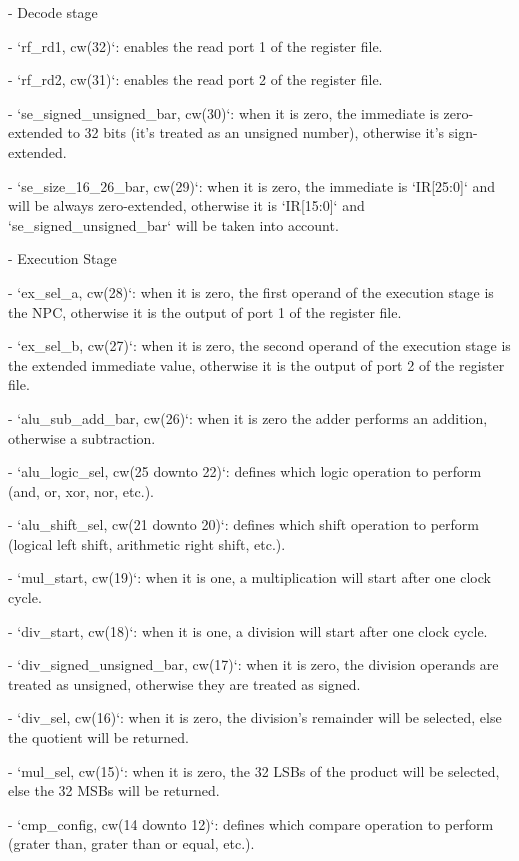 \begin{markdown}
- Decode stage

    - `rf_rd1, cw(32)`: enables the read port 1 of the register file.

    - `rf_rd2, cw(31)`: enables the read port 2 of the register file.

    - `se_signed_unsigned_bar, cw(30)`: when it is zero, the immediate is zero-extended to 32 bits (it's treated as an unsigned number), otherwise it's sign-extended.  

    - `se_size_16_26_bar, cw(29)`: when it is zero, the immediate is `IR[25:0]` and will be always zero-extended, otherwise it is `IR[15:0]` and `se_signed_unsigned_bar` will be taken into account.

- Execution Stage

    - `ex_sel_a, cw(28)`: when it is zero, the first operand of the execution stage is the NPC, otherwise it is the output of port 1 of the register file.

    - `ex_sel_b, cw(27)`: when it is zero, the second operand of the execution stage is the extended immediate value, otherwise it is the output of port 2 of the register file.

    - `alu_sub_add_bar, cw(26)`: when it is zero the adder performs an addition, otherwise a subtraction.

    - `alu_logic_sel, cw(25 downto 22)`: defines which logic operation to perform (and, or, xor, nor, etc.).

    - `alu_shift_sel, cw(21 downto 20)`: defines which shift operation to perform (logical left shift, arithmetic right shift, etc.).

    - `mul_start, cw(19)`: when it is one, a multiplication will start after one clock cycle.

    - `div_start, cw(18)`: when it is one, a division will start after one clock cycle.

    - `div_signed_unsigned_bar, cw(17)`: when it is zero, the division operands are treated as unsigned, otherwise they are treated as signed.

    - `div_sel, cw(16)`: when it is zero, the division's remainder will be selected, else the quotient will be returned.

    - `mul_sel, cw(15)`: when it is zero, the 32 LSBs of the product will be selected, else the 32 MSBs will be returned.

    - `cmp_config, cw(14 downto 12)`: defines which compare operation to perform (grater than, grater than or equal, etc.).


\end{markdown}
